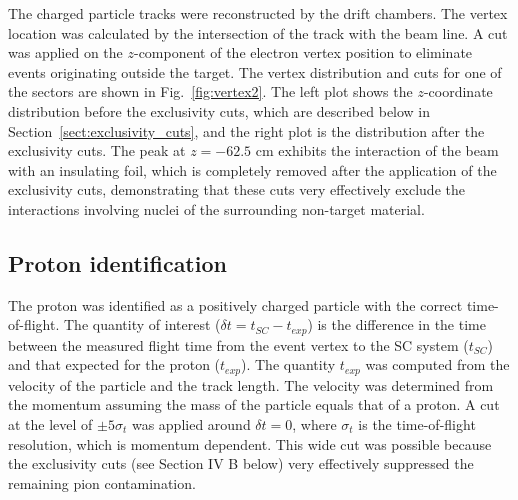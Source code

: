 \documentclass[prc,aps,floatfix,showpacs,showkeys,twocolumn,superscriptaddress,letterpaper,10pt]{revtex4-1}
\begin{document}
The charged particle tracks were reconstructed by the drift chambers. The vertex location was calculated by the intersection of the track with the beam line. 
 A cut was applied on the  $z$-component of the electron vertex  position to eliminate events  originating outside the target. The vertex distribution and cuts for one of the sectors are shown in Fig.~\ref{fig:vertex2}. The left plot shows the $z$-coordinate distribution before the exclusivity cuts, which are described below in Section~\ref{sect:exclusivity_cuts},  and the right plot  is the distribution after the exclusivity cuts. The peak at  $z=-62.5$ cm exhibits the interaction of the beam with an insulating foil,
which is completely removed after the application of the exclusivity cuts, demonstrating that these cuts very effectively exclude  the interactions involving nuclei of the surrounding non-target material.
\begin{figure*}
\caption{
The $z$-coordinate of the electron vertex. The vertical lines are the positions of the applied cuts. Note in (a) the small peak to the right of the target that is due to a foil placed at  $z=-62.5$ cm downstream of the target window.
In (b) the peak due to the foil  disappears after the selection of the exclusive reaction.}
\label{fig:vertex2}
\end{figure*}

\subsection{Proton identification} 
The proton was identified as a positively charged particle with the correct time-of-flight.
The  quantity of interest  ($\delta t=t_{SC}-t_{exp}$) is the difference in the time between the measured flight time from the event vertex to the SC system ($t_{SC}$) and that expected for the proton ($t_{exp}$). The quantity $t_{exp}$ was computed from the velocity of the particle and the track length. The velocity was determined from the momentum assuming the mass of the  particle equals that of a proton.
 A cut at the level of $\pm 5 \sigma_t$ was applied around  $\delta t = 0$, where  $\sigma_t$  is the time-of-flight resolution, which is momentum dependent.
This wide  cut was  possible because the exclusivity cuts (see Section IV B below) very effectively suppressed the remaining pion contamination. 
\end{document}
